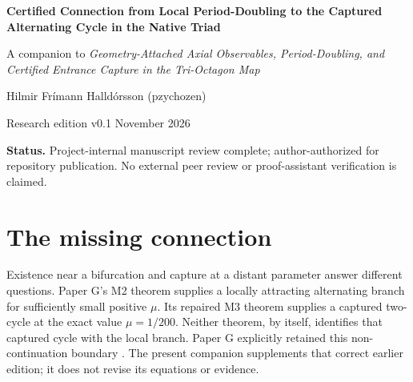\documentclass[11pt,a4paper]{article}
\numberwithin{equation}{section}
\begin{document}
\thispagestyle{plain}
{\LARGE\bfseries Certified Connection from Local Period-Doubling to the Captured Alternating Cycle in the Native Triad\par}
\vspace{5pt}
{\small A companion to \emph{Geometry-Attached Axial Observables, Period-Doubling, and Certified Entrance Capture in the Tri-Octagon Map}\par}
\vspace{7pt}
{\large Hilmir Fr\'imann Halld\'orsson (pzychozen)\par}
{\small Research edition v0.1  November 2026\par}
\vspace{5pt}
{\small\textbf{Status.} Project-internal manuscript review complete; author-authorized for repository publication. No external peer review or proof-assistant verification is claimed.\par}

\begin{abstract}
Paper G established a local supercritical period-doubling branch and, separately, capture by an alternating cycle at a specified finite parameter. We explain the accepted connection between those particular objects for the unchanged exact native-triad family. An amplitude formulation removes the apparent singularity at onset and fixes a nontrivial phase orientation. Its first uniform patch includes the bifurcation parameter. A finite certificate then covers $0<\mu\le1/200$ with 128 patches and 127 common-uniqueness joins. The entire refined endpoint enclosure lies strictly inside the exact inherited M3 trap, identifying the continued root with its unique two-step fixed point. The branch is a graph over $\mu$, continuous to the host and smooth for positive parameters. Inherited symmetry lifts every member to a primitive full-state two-cycle. A separate derivative bound proves local attraction modulo common phase only on $4999/1000000\le\mu\le1/200$. Attraction throughout the connected interval remains unresolved. These are mathematical statements about a fixed discrete map, with no physical-field identification or parameter ramp imposed on an orbit.
\end{abstract}

\section{The missing connection}\label{sec:introduction}
Existence near a bifurcation and capture at a distant parameter answer different questions. Paper G's M2 theorem supplies a locally attracting alternating branch for sufficiently small positive $\mu$. Its repaired M3 theorem supplies a captured two-cycle at the exact value $\mu=1/200$. Neither theorem, by itself, identifies that captured cycle with the local branch. Paper G explicitly retained this non-continuation boundary \cite{PG}. The present companion supplements that correct earlier edition; it does not revise its equations or evidence.
\end{document}
